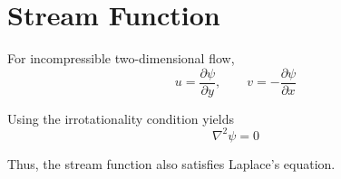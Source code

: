 \section{Stream Function}
\label{sec:stream-function}

For incompressible two-dimensional flow,
\[
u=\frac{\partial \psi}{\partial y},
\qquad
v=-\frac{\partial \psi}{\partial x}
\]

Using the irrotationality condition yields
\[
\nabla^2 \psi =0
\]

Thus, the stream function also satisfies Laplace's equation.
